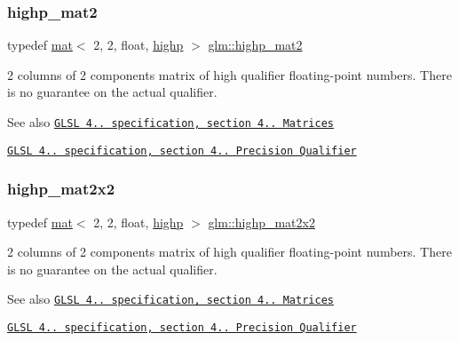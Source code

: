 \subsubsection{\texorpdfstring{highp\+\_\+mat2}{highp\_mat2}}
{\footnotesize\ttfamily typedef \hyperlink{structglm_1_1mat}{mat}$<$ 2, 2, float, \hyperlink{namespaceglm_a36ed105b07c7746804d7fdc7cc90ff25ac6f7eab42eacbb10d59a58e95e362074}{highp} $>$ \hyperlink{group__core__precision_gae7066dac53a008363d6faeabf46ccb03}{glm\+::highp\+\_\+mat2}}

2 columns of 2 components matrix of high qualifier floating-\/point numbers. There is no guarantee on the actual qualifier.

\begin{DoxySeeAlso}{See also}
\href{http://www.opengl.org/registry/doc/GLSLangSpec.4.20.8.pdf}{\tt G\+L\+SL 4.. specification, section 4.. Matrices} 

\href{http://www.opengl.org/registry/doc/GLSLangSpec.4.20.8.pdf}{\tt G\+L\+SL 4.. specification, section 4.. Precision Qualifier} 
\end{DoxySeeAlso}
\mbox{\label{group__core__precision_gacdb012ddb9e783ed51b0ee009bf0d822}} 
\subsubsection{\texorpdfstring{highp\+\_\+mat2x2}{highp\_mat2x2}}
{\footnotesize\ttfamily typedef \hyperlink{structglm_1_1mat}{mat}$<$ 2, 2, float, \hyperlink{namespaceglm_a36ed105b07c7746804d7fdc7cc90ff25ac6f7eab42eacbb10d59a58e95e362074}{highp} $>$ \hyperlink{group__core__precision_gacdb012ddb9e783ed51b0ee009bf0d822}{glm\+::highp\+\_\+mat2x2}}

2 columns of 2 components matrix of high qualifier floating-\/point numbers. There is no guarantee on the actual qualifier.

\begin{DoxySeeAlso}{See also}
\href{http://www.opengl.org/registry/doc/GLSLangSpec.4.20.8.pdf}{\tt G\+L\+SL 4.. specification, section 4.. Matrices} 

\href{http://www.opengl.org/registry/doc/GLSLangSpec.4.20.8.pdf}{\tt G\+L\+SL 4.. specification, section 4.. Precision Qualifier} 
\end{DoxySeeAlso}
\mbox{\label{group__core__precision_ga9d61903aea75d6932829cd049f2e622a}} 
